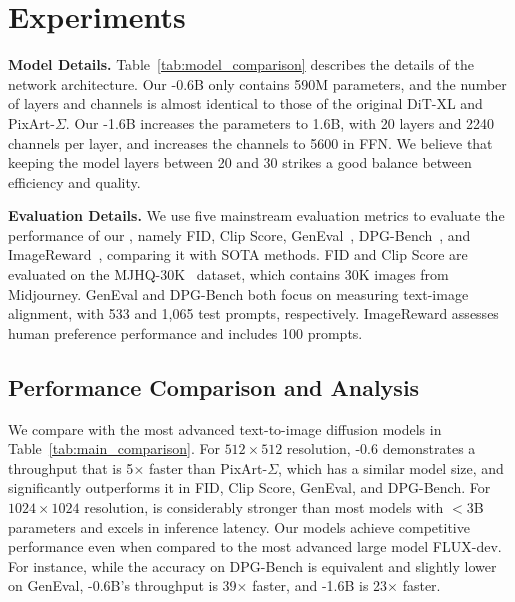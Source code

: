 \section{Experiments}

\noindent \textbf{Model Details.}
Table~\ref{tab:model_comparison} describes the details of the network architecture. Our \model-0.6B only contains 590M parameters, and the number of layers and channels is almost identical to those of the original DiT-XL and PixArt-$\Sigma$. Our \model-1.6B increases the parameters to 1.6B, with 20 layers and 2240 channels per layer, and increases the channels to 5600 in FFN. We believe that keeping the model layers between 20 and 30 strikes a good balance between efficiency and quality.

\noindent \textbf{Evaluation Details.}
We use five mainstream evaluation metrics to evaluate the performance of our \model, namely FID, Clip Score, GenEval~\citep{ghosh2024geneval}, DPG-Bench~\citep{hu2024ella}, and ImageReward~\citep{xu2024imagereward}, comparing it with SOTA methods. 
FID and Clip Score are evaluated on the MJHQ-30K~\citep{li2024playground} dataset, which contains 30K images from Midjourney. 
GenEval and DPG-Bench both focus on measuring text-image alignment, with 533 and 1,065 test prompts, respectively. 
ImageReward assesses human preference performance and includes 100 prompts.

\begin{table}[h!]
    \centering
    \caption{Architecture details of the proposed \model.}
    \vspace{-1em}
    \label{tab:model_comparison}
    \vspace{-1em}
\end{table}

\subsection{Performance Comparison and Analysis}

We compare \model{} with the most advanced text-to-image diffusion models in Table~\ref{tab:main_comparison}. 
For $512\times 512$ resolution, \model{}-0.6 demonstrates a throughput that is 5$\times$ faster than PixArt-$\Sigma$, which has a similar model size, and significantly outperforms it in FID, Clip Score, GenEval, and DPG-Bench.
%
For $1024\times 1024$ resolution, \model is considerably stronger than most models with $<$3B parameters and excels in inference latency. Our models achieve competitive performance even when compared to the most advanced large model FLUX-dev. For instance, while the accuracy on DPG-Bench is equivalent and slightly lower on GenEval, \model-0.6B's throughput is 39$\times$ faster, and \model-1.6B is 23$\times$ faster. 


